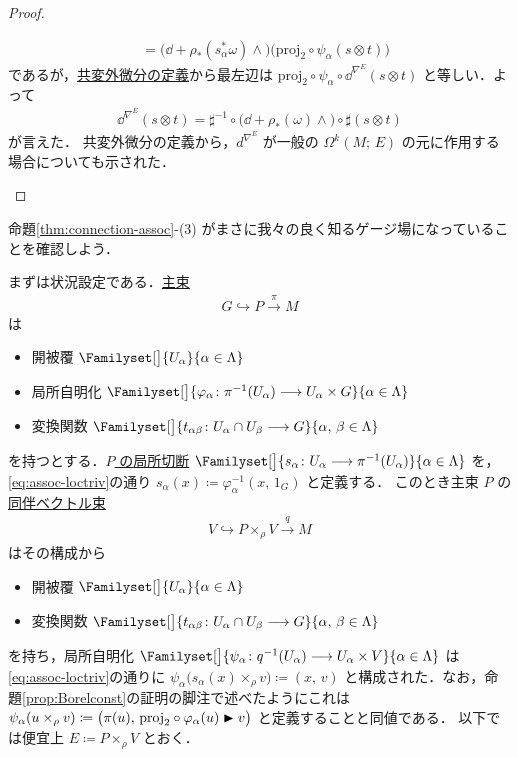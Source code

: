 \documentclass[geometry_main]{subfiles}
\begin{document}
\begin{proof}
\begin{enumerate}
\begin{align}
            &= \bigl( \dd + \rho_*(s_\alpha^*\omega) \wedge \bigr)  \bigl(\mathrm{proj}_2 \circ \psi_\alpha (s \otimes t) \bigr)
        \end{align}
        であるが，\hyperref[def:connection-vect]{共変外微分の定義}から最左辺は $\mathrm{proj}_2 \circ \psi_\alpha \circ \dd^{\nabla^E}(s \otimes t)$ と等しい．よって
        \begin{align}
            \dd^{\nabla^E} (s \otimes t) = \sharp^{-1} \circ \bigl( \dd + \rho_*(\omega) \wedge \bigr) \circ \sharp (s \otimes t)
        \end{align}
        が言えた．
        共変外微分の定義から，$d^{\nabla^E}$ が一般の $\Omega^k(M;\, E)$ の元に作用する場合についても示された．
    \end{enumerate}
\end{proof}

命題\ref{thm:connection-assoc}-(3) がまさに我々の良く知るゲージ場になっていることを確認しよう．

まずは状況設定である．\hyperref[def.PFD]{主束}
\begin{align}
    G \hookrightarrow P \xrightarrow{\pi} M
\end{align}
は
\begin{itemize}
    \item 開被覆 $\Familyset[\big]{U_\alpha}{\alpha \in \Lambda}$
    \item 局所自明化 $\Familyset[\big]{\varphi_\alpha \colon \pi^{-1}(U_\alpha) \lto U_\alpha \times G}{\alpha \in \Lambda}$ 
    \item 変換関数 $\Familyset[\big]{t_{\alpha\beta} \colon U_\alpha \cap U_\beta \lto G}{\alpha,\, \beta \in \Lambda}$
\end{itemize}
を持つとする．\underline{$P$ の}\hyperref[def.section]{局所切断} $\Familyset[\big]{s_\alpha \colon U_\alpha \lto \pi^{-1}(U_\alpha)}{\alpha \in \Lambda}$ を，\eqref{eq:assoc-loctriv}の通り $s_\alpha (x) \coloneqq \varphi_\alpha^{-1}(x,\, 1_G)$ と定義する．
このとき主束 $P$ の\hyperref[def:associated-vect]{同伴ベクトル束}
\begin{align}
    V \hookrightarrow P \times_\rho V \xrightarrow{q} M
\end{align}
はその構成から
\begin{itemize}
    \item 開被覆 $\Familyset[\big]{U_\alpha}{\alpha \in \Lambda}$
    \item 変換関数 $\Familyset[\big]{t_{\alpha\beta} \colon U_\alpha \cap U_\beta \lto G}{\alpha,\, \beta \in \Lambda}$
\end{itemize}
を持ち，局所自明化 $\Familyset[\big]{\psi_\alpha \colon q^{-1}(U_\alpha) \lto U_\alpha \times V}{\alpha \in \Lambda}$ は\eqref{eq:assoc-loctriv}の通りに $\psi_\alpha \bigl( s_\alpha(x) \times_\rho v \bigr) \coloneqq (x,\, v)$ と構成された．なお，命題\ref{prop:Borelconst}の証明の脚注で述べたようにこれは $\psi_\alpha(u \times_\rho v) \coloneqq \bigl( \pi(u),\, \mathrm{proj}_2 \circ \varphi_\alpha(u) \blacktriangleright v \bigr)$ と定義することと同値である．
以下では便宜上 $E \coloneqq P \times_\rho V$ とおく．
\end{document}
